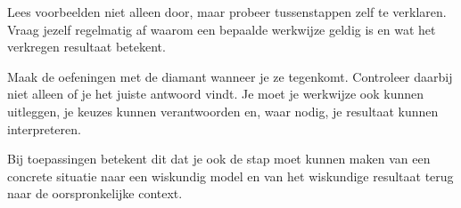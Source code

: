 
Lees voorbeelden niet alleen door, maar probeer tussenstappen zelf te
verklaren. Vraag jezelf regelmatig af waarom een bepaalde werkwijze geldig is
en wat het verkregen resultaat betekent.

Maak de oefeningen met de diamant wanneer je ze tegenkomt.
Controleer daarbij niet alleen of je het juiste antwoord vindt.
Je moet je werkwijze ook kunnen uitleggen, je keuzes kunnen verantwoorden
en, waar nodig, je resultaat kunnen interpreteren.

Bij toepassingen betekent dit dat je ook de stap moet kunnen maken van een
concrete situatie naar een wiskundig model en van het wiskundige resultaat
terug naar de oorspronkelijke context.




